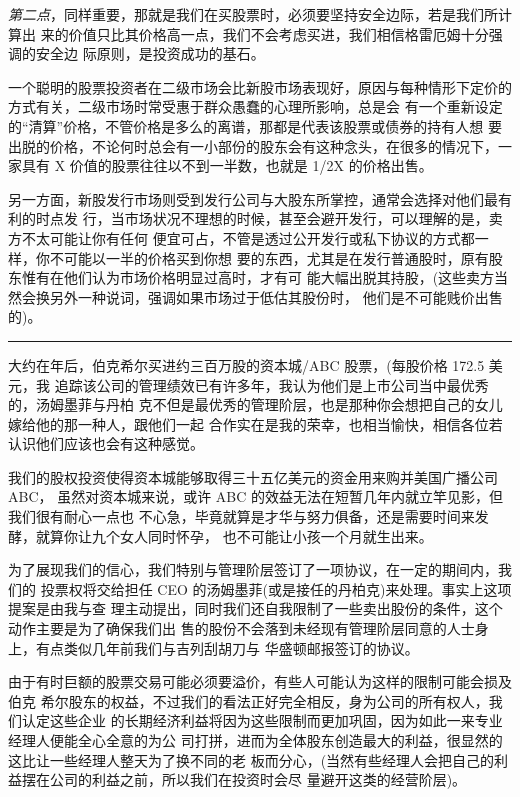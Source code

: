 \documentclass[UTF8,a4paper,zihao=-4,fontset = windows]{ctexart} %
\begin{document}
\textit{第二点}，同样重要，那就是我们在买股票时，必须要坚持安全边际，若是我们所计算出
来的价值只比其价格高一点，我们不会考虑买进，我们相信格雷厄姆十分强调的安全边
际原则，是投资成功的基石。

一个聪明的股票投资者在二级市场会比新股市场表现好，原因与每种情形下定价的方式有关，二级市场时常受惠于群众愚蠢的心理所影响，总是会
有一个重新设定的“清算”价格，不管价格是多么的离谱，那都是代表该股票或债券的持有人想
要出脱的价格，不论何时总会有一小部份的股东会有这种念头，在很多的情况下，一家具有
X 价值的股票往往以不到一半数，也就是 1/2X 的价格出售。

另一方面，新股发行市场则受到发行公司与大股东所掌控，通常会选择对他们最有利的时点发
行，当市场状况不理想的时候，甚至会避开发行，可以理解的是，卖方不太可能让你有任何
便宜可占，不管是透过公开发行或私下协议的方式都一样，你不可能以一半的价格买到你想
要的东西，尤其是在发行普通股时，原有股东惟有在他们认为市场价格明显过高时，才有可
能大幅出脱其持股，(这些卖方当然会换另外一种说词，强调如果市场过于低估其股份时，
他们是不可能贱价出售的)。

\rule{10cm}{0.4pt}

大约在年后，伯克希尔买进约三百万股的资本城/ABC 股票，(每股价格 172.5 美元，我
追踪该公司的管理绩效已有许多年，我认为他们是上市公司当中最优秀的，汤姆墨菲与丹柏
克不但是最优秀的管理阶层，也是那种你会想把自己的女儿嫁给他的那一种人，跟他们一起
合作实在是我的荣幸，也相当愉快，相信各位若认识他们应该也会有这种感觉。

我们的股权投资使得资本城能够取得三十五亿美元的资金用来购并美国广播公司 ABC，
虽然对资本城来说，或许 ABC 的效益无法在短暂几年内就立竿见影，但我们很有耐心一点也
不心急，毕竟就算是才华与努力俱备，还是需要时间来发酵，就算你让九个女人同时怀孕，
也不可能让小孩一个月就生出来。

为了展现我们的信心，我们特别与管理阶层签订了一项协议，在一定的期间内，我们的
投票权将交给担任 CEO 的汤姆墨菲(或是接任的丹柏克)来处理。事实上这项提案是由我与查
理主动提出，同时我们还自我限制了一些卖出股份的条件，这个动作主要是为了确保我们出
售的股份不会落到未经现有管理阶层同意的人士身上，有点类似几年前我们与吉列刮胡刀与
华盛顿邮报签订的协议。

由于有时巨额的股票交易可能必须要溢价，有些人可能认为这样的限制可能会损及伯克
希尔股东的权益，不过我们的看法正好完全相反，身为公司的所有权人，我们认定这些企业
的长期经济利益将因为这些限制而更加巩固，因为如此一来专业经理人便能全心全意的为公
司打拼，进而为全体股东创造最大的利益，很显然的这比让一些经理人整天为了换不同的老
板而分心，(当然有些经理人会把自己的利益摆在公司的利益之前，所以我们在投资时会尽
量避开这类的经营阶层)。
\end{document}

